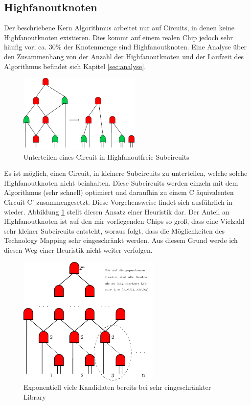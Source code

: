 \documentclass[11pt, a4paper, german]{article}
\newcommand{\TM}{Technology  Mapping }
\begin{document}
\subsection{Highfanoutknoten}
\label{subsec:highfanout}
Der beschriebene Kern Algorithmus arbeitet nur auf Circuits, in denen keine Highfanoutknoten existieren. Dies kommt auf einem realen Chip jedoch sehr häufig vor; ca. $30\%$ der Knotenmenge sind Highfanoutknoten. Eine Analyse über den Zusammenhang von der Anzahl der Highfanoutknoten und der Laufzeit des Algorithmus befindet sich Kapitel \ref{sec:analyse}.\\
 \begin{figure}
		\includegraphics[width = 6cm]{pictures/compiled/ohne_highfanout_heu}
		\caption{Unterteilen eines Circuit in Highfanoutfreie Subcircuits}
		\label{bild:ohne_highfanout_heu}
\end{figure}
 Es ist möglich, einen Circuit, in kleinere Subcircuits zu unterteilen, welche solche Highfanoutknoten nicht beinhalten. Diese Subcircuits werden einzeln mit dem Algorithmus (sehr schnell) optimiert und daraufhin zu einem C äquivalenten Circuit C' zusammengesetzt. Diese Vorgehensweise findet sich ausführlich in \cite{DAGON} wieder. Abbildung \ref{bild:ohne_highfanout_heu} stellt diesen Ansatz einer Heuristik dar. 
  Der Anteil an Highfanoutknoten ist auf den mir vorliegenden Chips so groß, dass eine Vielzahl sehr kleiner Subcircuits entsteht, woraus folgt, dass die Möglichkeiten des \TM sehr eingeschränkt werden. Aus diesem Grund werde ich diesen Weg einer Heuristik nicht weiter verfolgen.\\

\begin{figure}%
\includegraphics[width= 7cm]{pictures/compiled/expo_kand}
\caption{Exponentiell viele Kandidaten bereits bei sehr eingeschränkter Library}
\label{bild:expo_kan}
\end{figure}
\end{document}
